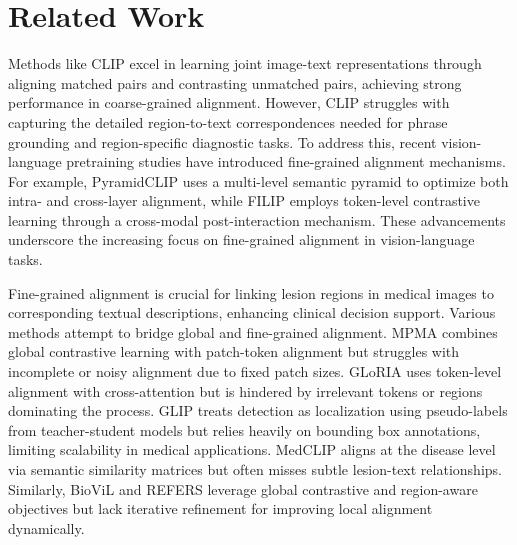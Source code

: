 \section{Related Work}
Methods like CLIP \cite{CLIP} excel in learning joint image-text representations through aligning matched pairs and contrasting unmatched pairs, achieving strong performance in coarse-grained alignment. However, CLIP struggles with capturing the detailed region-to-text correspondences needed for phrase grounding and region-specific diagnostic tasks. To address this, recent vision-language pretraining studies have introduced fine-grained alignment mechanisms. For example, PyramidCLIP \cite{PyramidCLIP} uses a multi-level semantic pyramid to optimize both intra- and cross-layer alignment, while FILIP \cite{FILIP} employs token-level contrastive learning through a cross-modal post-interaction mechanism. These advancements underscore the increasing focus on fine-grained alignment in vision-language tasks.

Fine-grained alignment is crucial for linking lesion regions in medical images to corresponding textual descriptions, enhancing clinical decision support. Various methods attempt to bridge global and fine-grained alignment. MPMA \cite{MPMA} combines global contrastive learning with patch-token alignment but struggles with incomplete or noisy alignment due to fixed patch sizes. GLoRIA \cite{GLoRIA} uses token-level alignment with cross-attention but is hindered by irrelevant tokens or regions dominating the process. GLIP \cite{GLIP} treats detection as localization using pseudo-labels from teacher-student models but relies heavily on bounding box annotations, limiting scalability in medical applications. MedCLIP \cite{MedCLIP} aligns at the disease level via semantic similarity matrices but often misses subtle lesion-text relationships. Similarly, BioViL \cite{BioViL} and REFERS \cite{REFERS} leverage global contrastive and region-aware objectives but lack iterative refinement for improving local alignment dynamically.